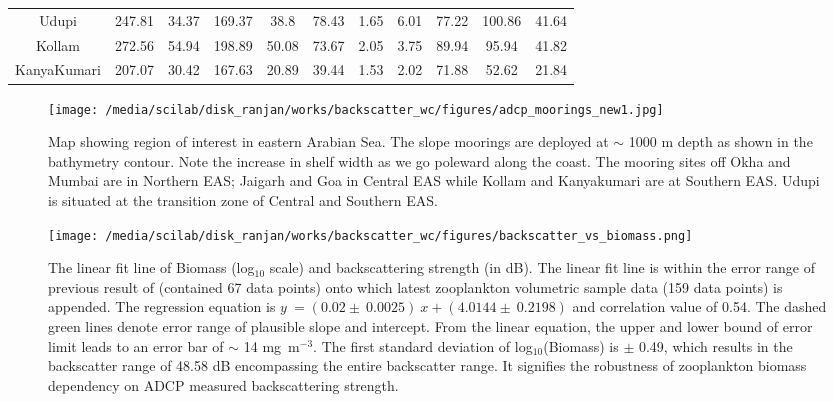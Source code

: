 \documentclass{article}
\begin{document}
\begin{table}[t]
{\begin{adjustwidth}{0in}{0in}
\begin{tabular}{ccccccccccc}
	Udupi       & 247.81           & 34.37          & 169.37  & 38.8                     & 78.43                                                                                                            & 1.65 & 6.01 & 77.22         & 100.86       & 41.64  \\
	Kollam      & 272.56           & 54.94          & 198.89  & 50.08                    & 73.67                                                                                                            & 2.05 & 3.75 & 89.94         & 95.94        & 41.82  \\
	KanyaKumari & 207.07           & 30.42          & 167.63  & 20.89                    & 39.44                                                                                                            & 1.53 & 2.02 & 71.88         & 52.62        & 21.84  \\ \hline
	\end{tabular}
	\end{adjustwidth}
    \label{tab:table3}
    }
\end{table}

\newpage
\begin{figure}[htbp]
	\centering
	\texttt{[image: /media/scilab/disk\_ranjan/works/backscatter\_wc/figures/adcp\_moorings\_new1.jpg]} 
	\captionsetup{justification=justified,font=footnotesize,skip=0.05\baselineskip,width=0.8\textwidth}
	\caption{Map showing region of interest in eastern Arabian Sea. The slope moorings are
		deployed at $\sim$ 1000 m depth as shown in the bathymetry contour. Note the increase in shelf width as we go poleward along the coast. The mooring sites off Okha and Mumbai are in Northern EAS; Jaigarh and Goa in Central EAS while Kollam and Kanyakumari are at Southern EAS. Udupi is situated at the transition zone of Central and Southern EAS.}
	\label{fig:map}
\end{figure}

\newpage
\begin{figure}[htbp]
	\centering
	\texttt{[image: /media/scilab/disk\_ranjan/works/backscatter\_wc/figures/backscatter\_vs\_biomass.png]} 
	\captionsetup{justification=justified,font=footnotesize,skip=0.05\baselineskip,width=0.8\textwidth}
	\caption{The linear fit line of Biomass (log$_{10}$ scale) and backscattering strength (in dB). The linear fit line is within the error range of previous result of \citep{aparna2022seasonal} (contained 67 data points) onto which latest zooplankton volumetric sample data (159 data points) is appended. The regression equation is $y\ = (0.02 \pm\ 0.0025) \ x + (4.0144 \pm \ 0.2198) $ and correlation value of 0.54. The dashed green lines denote error range of plausible slope and intercept. From the linear equation, the upper and lower bound of error limit leads to an error bar of $\sim$  14  mg~m$^{-3}$. The first standard deviation of log$_{10}$(Biomass) is $\pm$ 0.49, which results in the backscatter range of 48.58 dB encompassing the entire backscatter range. It signifies the robustness of zooplankton biomass dependency on ADCP measured backscattering strength.}
	\label{fig:bstobm}
\end{figure}
\end{document}
